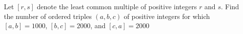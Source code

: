 Let $[r,s]$ denote the least common multiple of positive integers $r$ and $s$.  Find the number of ordered triples $(a,b,c)$ of positive integers for which $[a,b] = 1000$, $[b,c] = 2000$, and $[c,a] = 2000$